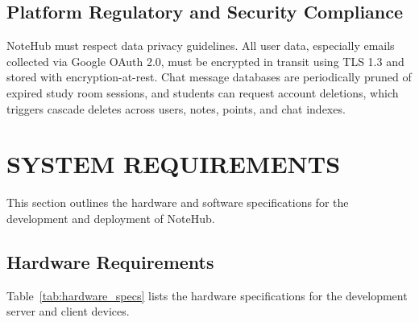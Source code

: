 \documentclass[12,Times new Roman,a4paper]{report}
\begin{document}
\subsection{Platform Regulatory and Security Compliance}
NoteHub must respect data privacy guidelines. All user data, especially emails collected via Google OAuth 2.0, must be encrypted in transit using TLS 1.3 and stored with encryption-at-rest. Chat message databases are periodically pruned of expired study room sessions, and students can request account deletions, which triggers cascade deletes across users, notes, points, and chat indexes.

\section{SYSTEM REQUIREMENTS}
This section outlines the hardware and software specifications for the development and deployment of NoteHub.

\subsection{Hardware Requirements}
Table~\ref{tab:hardware_specs} lists the hardware specifications for the development server and client devices.

\begin{table}[htbp]
\centering
\caption{System Hardware Specifications}
\label{tab:hardware_specs}
\end{table}
\end{document}
